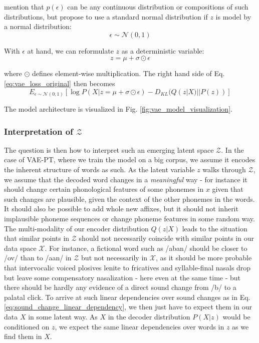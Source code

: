 \documentclass[6pt]{article}
\begin{document}
\cite{kingma2013auto} mention that  $p(\epsilon)$ can be any continuous distribution or compositions of such distributions, but propose to use a standard normal distribution if $z$ is model by a normal distribution:
\begin{equation}
\epsilon \sim \mathcal{N}(0,1)
\end{equation}

With $\epsilon$ at hand, we can reformulate $z$ as a deterministic variable:
\begin{equation}
z = \mu + \sigma \odot \epsilon
\end{equation}

where $\odot$ defines element-wise multiplication.
The right hand side of Eq. \ref{eq:vae_loss_original} then becomes
\begin{equation}
\label{eq:vae_loss_reparameterized}
E_{\epsilon \sim \mathcal{N}(0,1)}[\log P(X|z= \mu + \sigma \odot \epsilon) - D_{KL}(Q(z|X)||P(z))] 
\end{equation}

The model architecture is visualized in Fig. \ref{fig:vae_model_visualization}. 




\subsubsection{Interpretation of $\mathcal{Z}$}
\label{interpretation_of_z}
The question is then how to interpret such an emerging latent space $\mathcal{Z}$. In the case of VAE-PT, where we train the model on a big corpus, we assume it encodes the inherent structure of words as such. As the latent variable $z$ walks through $\mathcal{Z}$, we assume that the decoded word changes in a \textit{meaningful} way - for instance it should change certain phonological features of some phonemes in $x$ given that such changes are plausible, given the context of the other phonemes in the words. It should also be possible to add whole new affixes, but it should not inherit implausible phoneme sequences or change phoneme features in some random way. The multi-modality of our encoder distribution $Q(z|X)$ leads to the situation that similar points in $\mathcal{Z}$ should not necessarily coincide with similar points in our data space $\mathcal{X}$. For instance, a fictional word such as /aban/ should be closer to /ov/ than to /a\textipa{\textdoublebarpipe}an/ in $\mathcal{Z}$ but not necessarily in $\mathcal{X}$, as it should be more probable that intervocalic voiced plosives lenite to fricatives and syllable-final nasals drop but leave some compensatory nasalization - here even at the same time - but there should be hardly any evidence of a direct sound change from /b/ to a palatal click. To arrive at such linear dependencies over sound changes as in Eq. \ref{eq:sound_change_linear_dependency}, we then just have to expect them in our data $X$ in some latent way. As $X$ in the decoder distribution $P(X|z)$ would be conditioned on $z$, we expect the same linear dependencies over words in $z$ as we find them in $X$.
\end{document}
